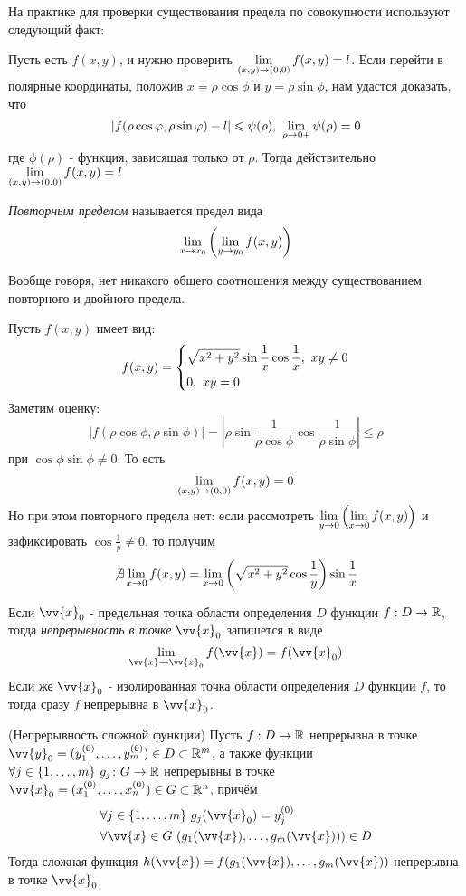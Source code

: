 \begin{addition}
	На практике для проверки существования предела по совокупности используют следующий факт:
	
	Пусть есть $f(x, y)$, и нужно проверить $\lim\limits_{(x, y) \to (0, 0)} f(x, y) = l$. Если перейти в полярные координаты, положив $x = \rho \cos \phi$ и $y = \rho \sin \phi$, нам удастся доказать, что
	\[
		|f(\rho \cos\varphi, \rho \sin\varphi) - l| \leqslant \psi(\rho),\ \lim\limits_{\rho \to 0+} \psi(\rho) = 0
	\]
	где $\phi(\rho)$ - функция, зависящая только от $\rho$. Тогда действительно $\lim\limits_{(x, y) \to (0, 0)} f(x, y) = l$
\end{addition}

\begin{definition}
	\textit{Повторным пределом} называется предел вида
	\[
		\lim\limits_{x \to x_0} \left(\lim\limits_{y \to y_0} f(x, y)\right)
	\]
\end{definition}

\begin{note}
	Вообще говоря, нет никакого общего соотношения между существованием повторного и двойного предела.
\end{note}

\begin{example}
	Пусть $f(x, y)$ имеет вид:
	\[
		f(x, y) = \System{
			&{\sqrt{x^2 + y^2} \sin \frac{1}{x} \cos \frac{1}{x}},\ xy \neq 0
			\\
			&{0,\ xy = 0}
		}
	\]
	Заметим оценку:
	\[
		|f(\rho\cos\phi, \rho\sin\phi)| =  \left|\rho\sin\frac{1}{\rho\cos\phi}\cos\frac{1}{\rho\sin\phi}\right| \le \rho
	\]
	при $\cos\phi\sin\phi \neq 0$. То есть
	\[
		\lim\limits_{(x, y) \to (0, 0)} f(x, y) = 0
	\]
	Но при этом повторного предела нет: если рассмотреть $\lim\limits_{y \to 0} \left(\lim\limits_{x \to 0} f(x, y)\right)$ и зафиксировать $\cos \frac{1}{y} \neq 0$, то получим
	\[
		\not\exists \lim\limits_{x \to 0} f(x, y) = \lim\limits_{x \to 0} \left(\sqrt{x^2 + y^2} \cos\frac{1}{y}\right)\sin\frac{1}{x}
	\]
\end{example}

\begin{definition}
	Если $\vv{x}_0$ - предельная точка области определения $D$ функции $f: D \to \mathbb{R}$, тогда \textit{непрерывность в точке} $\vv{x}_0$ запишется в виде
	\[
		\liml_{\vv{x} \to \vv{x}_0} f(\vv{x}) = f(\vv{x}_0)
	\]
	Если же $\vv{x}_0$ - изолированная точка области определения $D$ функции $f$, то тогда сразу $f$ непрерывна в $\vv{x}_0$.
\end{definition}

\begin{theorem} (Непрерывность сложной функции)
	Пусть $f: D \to \mathbb{R}$ непрерывна в точке $\vv{y}_0 = (y_1^{(0)}, \ldots, y_m^{(0)}) \in D \subset \R^m$, а также функции $\forall j \in \{1, \ldots, m\}\ g_j \colon G \to \mathbb{R}$ непрерывны в точке $\vv{x}_0 = (x_1^{(0)}, \ldots, x_n^{(0)}) \in G \subset \R^n$, причём
	\begin{align*}
		&{\forall j \in \range{m}\ g_j(\vv{x}_0) = y_j^{(0)}}
		\\
		&{\forall \vv{x} \in G\ (g_1(\vv{x}), \ldots, g_m(\vv{x}))) \in D}
	\end{align*}
	Тогда сложная функция $h(\vv{x}) = f(g_1(\vv{x}), \ldots, g_m(\vv{x}))$ непрерывна в точке $\vv{x}_0$
\end{theorem}


